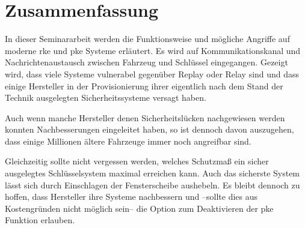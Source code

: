 \chapter{Zusammenfassung}

In dieser Seminararbeit werden die Funktionsweise und mögliche Angriffe auf moderne \gls{rke} und \gls{pke} Systeme erläutert. Es wird auf Kommunikationskanal und Nachrichtenaustausch zwischen Fahrzeug und Schlüssel eingegangen. Gezeigt wird, dass viele Systeme vulnerabel gegenüber \foreignlanguage{english}{Replay} oder \foreignlanguage{english}{Relay} sind und dass einige Hersteller in der Provisionierung ihrer eigentlich nach dem Stand der Technik ausgelegten Sicherheitssysteme versagt haben.

Auch wenn manche Hersteller denen Sicherheitslücken nachgewiesen werden konnten Nachbesserungen eingeleitet haben, so ist dennoch davon auszugehen, dass einige Millionen ältere Fahrzeuge immer noch angreifbar sind.

Gleichzeitig sollte nicht vergessen werden, welches Schutzmaß ein sicher ausgelegtes Schlüsselsystem maximal erreichen kann. Auch das sicherste System lässt sich durch Einschlagen der Fensterscheibe aushebeln. Es bleibt dennoch zu hoffen, dass Hersteller ihre Systeme nachbessern und --sollte dies aus Kostengründen nicht möglich sein-- die Option zum Deaktivieren der \gls{pke} Funktion erlauben.
